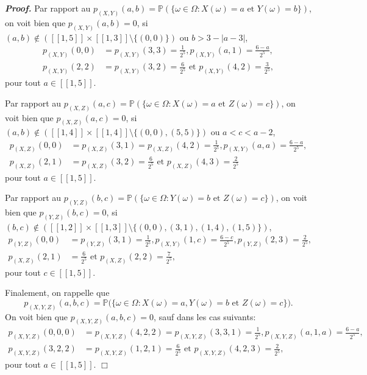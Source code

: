 \documentclass[11pt,a4paper]{article}
\newenvironment{preuve}[1][]
{\vskip 2mm  \noindent\emph{\bf Proof#1. }}{$\Box$ \vskip 2mm}
\begin{document}
\begin{preuve}
			Par rapport au $p_{(X,Y)}(a,b) = \mathbb{P}(\{ \omega \in \Omega : X(\omega) = a \text{ et } Y(\omega) = b \})$, on voit bien que 
			$p_{(X,Y)}(a,b) = 0$, si $(a,b) \notin ([\![ 1,5 ]\!] \times [\![ 1,3 ]\!] \setminus \{ (0,0) \})$ ou $b > 3 - |a - 3|$,  
			\begin{align*}
			p_{(X,Y)}(0,0) &= p_{(X,Y)}(3,3) = \frac{1}{2^{5}}, p_{(X,Y)}(a,1) = \frac{6-a}{2^{5}},  
			\\ p_{(X,Y)}(2,2) &= p_{(X,Y)}(3,2)= \frac{6}{2^{5}} \text{ et }  p_{(X,Y)}(4,2) = \frac{3}{2^{5}},
			\end{align*}            
			pour tout $a \in [\![ 1,5 ]\!]$.  
			
			Par rapport au $p_{(X,Z)}(a,c) = \mathbb{P}(\{ \omega \in \Omega : X(\omega) = a \text{ et } Z(\omega) = c \})$, on voit bien que 
			$p_{(X,Z)}(a,c) = 0$, si $(a,b) \notin ([\![ 1,4 ]\!] \times [\![ 1,4 ]\!] \setminus \{ (0,0), (5,5) \})$ ou $a < c < a - 2$,  
			\begin{align*}
			p_{(X,Z)}(0,0) &= p_{(X,Z)}(3,1) = p_{(X,Z)}(4,2) = \frac{1}{2^{5}}, p_{(X,Y)}(a,a) = \frac{6-a}{2^{5}}, 
			\\
			p_{(X,Z)}(2,1) &= p_{(X,Z)}(3,2) = \frac{6}{2^{5}} \text{ et } p_{(X,Z)}(4,3) = \frac{2}{2^{5}}
			\end{align*}            
			pour tout $a \in [\![ 1,5 ]\!]$.  
			
			Par rapport au $p_{(Y,Z)}(b,c) = \mathbb{P}(\{ \omega \in \Omega : Y(\omega) = b \text{ et } Z(\omega) = c \})$, on voit bien que 
			$p_{(Y,Z)}(b,c) = 0$, si $(b,c) \notin ([\![ 1,2 ]\!] \times [\![ 1,3 ]\!] \setminus \{ (0,0), (3,1), (1,4), (1,5) \})$,  
			\begin{align*}
			p_{(Y,Z)}(0,0) &= p_{(Y,Z)}(3,1) = \frac{1}{2^{5}}, p_{(X,Y)}(1,c) = \frac{6-c}{2^{5}}, p_{(Y,Z)}(2,3) = \frac{2}{2^{5}},
			\\
			p_{(X,Z)}(2,1) &= \frac{6}{2^{5}} \text{ et } p_{(X,Z)}(2,2) = \frac{7}{2^{5}},
			\end{align*}            
			pour tout $c \in [\![ 1,5 ]\!]$.  
			
			Finalement, on rappelle que 
			\[     p_{(X,Y,Z)}(a,b,c) = \mathbb{P}\Big(\big\{ \omega \in \Omega : X(\omega) = a, Y(\omega) = b \text{ et } Z(\omega) = c \big\}\Big).     \] 
			On voit bien que $p_{(X,Y,Z)}(a,b,c) = 0$, sauf dans les cas suivants: 
			\begin{align*}
			p_{(X,Y,Z)}(0,0,0) &= p_{(X,Y,Z)}(4,2,2) = p_{(X,Y,Z)}(3,3,1) = \frac{1}{2^{5}}, p_{(X,Y,Z)}(a,1,a) = \frac{6-a}{2^{5}}, 
			\\
			p_{(X,Y,Z)}(3,2,2) &= p_{(X,Y,Z)}(1,2,1) = \frac{6}{2^{5}} \text{ et } p_{(X,Y,Z)}(4,2,3) = \frac{2}{2^{5}},
			\end{align*}            
			pour tout $a \in [\![ 1,5 ]\!]$.  
		\end{preuve}
		
\end{document}
